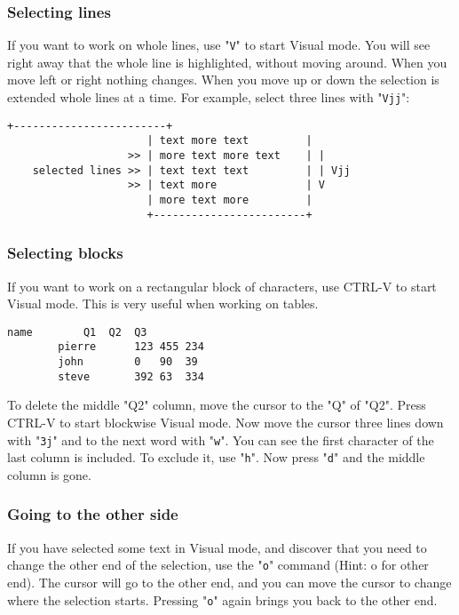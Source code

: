 \subsubsection{Selecting lines}

If you want to work on whole lines, use "\texttt{V}" to start Visual mode.
You will see right away that the whole line is highlighted, without moving around.
When you move left or right nothing changes.
When you move up or down the selection is extended whole lines at a time.
For example, select three lines with "\texttt{Vjj}":

\begin{Verbatim}[samepage=true]
                      +------------------------+
                      | text more text         |
                   >> | more text more text    | |
    selected lines >> | text text text         | | Vjj
                   >> | text more              | V
                      | more text more         |
                      +------------------------+
\end{Verbatim}

\subsubsection{Selecting blocks}

If you want to work on a rectangular block of characters, use CTRL-V to start
Visual mode.  This is very useful when working on tables.
\begin{Verbatim}[samepage=true]
        name        Q1  Q2  Q3
        pierre      123 455 234
        john        0   90  39
        steve       392 63  334
\end{Verbatim}

To delete the middle "Q2" column, move the cursor to the "Q" of "Q2".
Press CTRL-V to start blockwise Visual mode.
Now move the cursor three lines down with "\texttt{3j}" and to the next word with "\texttt{w}".
You can see the first character of the last column is included.
To exclude it, use "\texttt{h}".
Now press "\texttt{d}" and the middle column is gone.

\subsubsection{Going to the other side}

If you have selected some text in Visual mode, and discover that you need to change the other end of the selection, use the "\texttt{o}" command (Hint: o for other end).
The cursor will go to the other end, and you can move the cursor to change where the selection starts.
Pressing "\texttt{o}" again brings you back to the other end.

